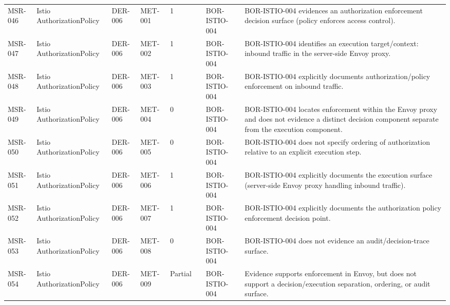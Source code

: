 \documentclass{article}
\begin{document}
\begin{longtable}{@{}p{}p{}p{}p{}p{}p{}p{}p{}@{}}
MSR-046 & Istio AuthorizationPolicy & DER-006 & MET-001 & 1 &  & BOR-ISTIO-004 & BOR-ISTIO-004 evidences an authorization enforcement decision surface (policy enforces access control).\\
MSR-047 & Istio AuthorizationPolicy & DER-006 & MET-002 & 1 &  & BOR-ISTIO-004 & BOR-ISTIO-004 identifies an execution target/context: inbound traffic in the server-side Envoy proxy.\\
MSR-048 & Istio AuthorizationPolicy & DER-006 & MET-003 & 1 &  & BOR-ISTIO-004 & BOR-ISTIO-004 explicitly documents authorization/policy enforcement on inbound traffic.\\
MSR-049 & Istio AuthorizationPolicy & DER-006 & MET-004 & 0 &  & BOR-ISTIO-004 & BOR-ISTIO-004 locates enforcement within the Envoy proxy and does not evidence a distinct decision component separate from the execution component.\\
MSR-050 & Istio AuthorizationPolicy & DER-006 & MET-005 & 0 &  & BOR-ISTIO-004 & BOR-ISTIO-004 does not specify ordering of authorization relative to an explicit execution step.\\
MSR-051 & Istio AuthorizationPolicy & DER-006 & MET-006 & 1 &  & BOR-ISTIO-004 & BOR-ISTIO-004 explicitly documents the execution surface (server-side Envoy proxy handling inbound traffic).\\
MSR-052 & Istio AuthorizationPolicy & DER-006 & MET-007 & 1 &  & BOR-ISTIO-004 & BOR-ISTIO-004 explicitly documents the authorization policy enforcement decision point.\\
MSR-053 & Istio AuthorizationPolicy & DER-006 & MET-008 & 0 &  & BOR-ISTIO-004 & BOR-ISTIO-004 does not evidence an audit/decision-trace surface.\\
MSR-054 & Istio AuthorizationPolicy & DER-006 & MET-009 & Partial &  & BOR-ISTIO-004 & Evidence supports enforcement in Envoy, but does not support a decision/execution separation, ordering, or audit surface.\\


\end{longtable}
\end{document}
